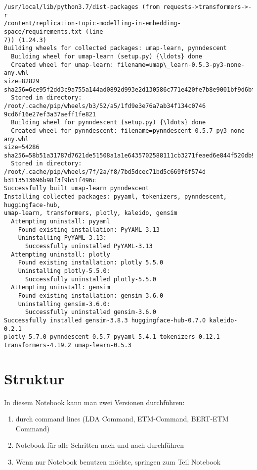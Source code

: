 \documentclass[11pt]{article}
\providecommand{\tightlist}{%
      \setlength{\itemsep}{0pt}\setlength{\parskip}{0pt}}
\begin{document}
\begin{Verbatim}[commandchars=\\\{\}]
/usr/local/lib/python3.7/dist-packages (from requests->transformers->-r
/content/replication-topic-modelling-in-embedding-space/requirements.txt (line
7)) (1.24.3)
Building wheels for collected packages: umap-learn, pynndescent
  Building wheel for umap-learn (setup.py) {\ldots} done
  Created wheel for umap-learn: filename=umap\_learn-0.5.3-py3-none-any.whl
size=82829
sha256=6ce95f2dd3c9a755a144ad0892d993e2d130586c771e420fe7b8e9001bf9d6bf
  Stored in directory: /root/.cache/pip/wheels/b3/52/a5/1fd9e3e76a7ab34f134c0746
9cd6f16e27ef3a37aeff1fe821
  Building wheel for pynndescent (setup.py) {\ldots} done
  Created wheel for pynndescent: filename=pynndescent-0.5.7-py3-none-any.whl
size=54286
sha256=58b51a31787d7621de51508a1a1e6435702588111cb3271feaed6e844f520db9
  Stored in directory: /root/.cache/pip/wheels/7f/2a/f8/7bd5dcec71bd5c669f6f574d
b3113513696b98f3f9b51f496c
Successfully built umap-learn pynndescent
Installing collected packages: pyyaml, tokenizers, pynndescent, huggingface-hub,
umap-learn, transformers, plotly, kaleido, gensim
  Attempting uninstall: pyyaml
    Found existing installation: PyYAML 3.13
    Uninstalling PyYAML-3.13:
      Successfully uninstalled PyYAML-3.13
  Attempting uninstall: plotly
    Found existing installation: plotly 5.5.0
    Uninstalling plotly-5.5.0:
      Successfully uninstalled plotly-5.5.0
  Attempting uninstall: gensim
    Found existing installation: gensim 3.6.0
    Uninstalling gensim-3.6.0:
      Successfully uninstalled gensim-3.6.0
Successfully installed gensim-3.8.3 huggingface-hub-0.7.0 kaleido-0.2.1
plotly-5.7.0 pynndescent-0.5.7 pyyaml-5.4.1 tokenizers-0.12.1
transformers-4.19.2 umap-learn-0.5.3
\end{Verbatim}

    \hypertarget{struktur}{%
\section{\texorpdfstring{\textbf{Struktur}}{Struktur}}\label{struktur}}

In diesem Notebook kann man zwei Versionen durchführen:

\begin{enumerate}
\def\labelenumi{\arabic{enumi}.}
\tightlist
\item
  durch command lines (LDA Command, ETM-Command, BERT-ETM Command)
\item
  Notebook für alle Schritten nach und nach durchführen
\item
  Wenn nur Notebook benutzen möchte, springen zum Teil Notebook
\end{enumerate}
\end{document}
